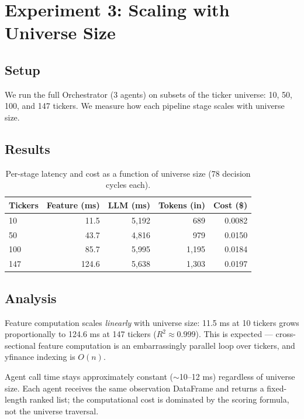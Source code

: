\documentclass[10pt,conference]{IEEEtran}
\begin{document}
\section{Experiment 3: Scaling with Universe Size}
\label{sec:exp3}

\subsection{Setup}

We run the full Orchestrator (3 agents) on subsets of the ticker universe: 10, 50, 100, and 147 tickers. We measure how each pipeline stage scales with universe size.

\subsection{Results}

\begin{table}[h]
    \centering
    \caption{Per-stage latency and cost as a function of universe size (78 decision cycles each).}
    \begin{tabular}{lrrrr}
        \toprule
        \textbf{Tickers} & \textbf{Feature (ms)} & \textbf{LLM (ms)} & \textbf{Tokens (in)} & \textbf{Cost (\$)} \\
        \midrule
        10  & 11.5  & 5,192 & 689  & 0.0082 \\
        50  & 43.7  & 4,816 & 979  & 0.0150 \\
        100 & 85.7  & 5,995 & 1,195 & 0.0184 \\
        147 & 124.6 & 5,638 & 1,303 & 0.0197 \\
        \bottomrule
    \end{tabular}
    \label{tab:exp3_scaling}
\end{table}

\subsection{Analysis}

Feature computation scales \textit{linearly} with universe size: 11.5 ms at 10 tickers grows proportionally to 124.6 ms at 147 tickers ($R^2 \approx 0.999$). This is expected --- cross-sectional feature computation is an embarrassingly parallel loop over tickers, and yfinance indexing is $O(n)$.

Agent call time stays approximately constant ($\sim$10--12 ms) regardless of universe size. Each agent receives the same observation DataFrame and returns a fixed-length ranked list; the computational cost is dominated by the scoring formula, not the universe traversal.
\end{document}

